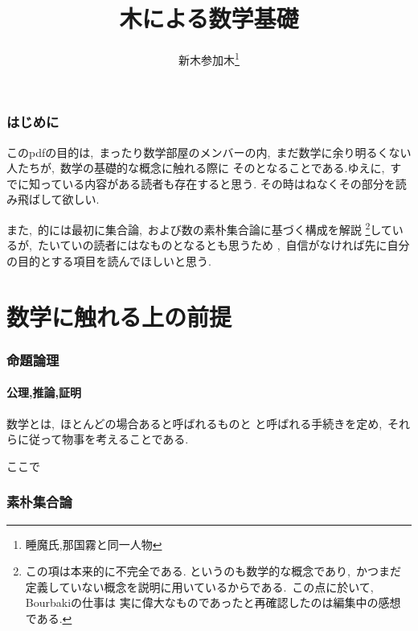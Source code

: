 \documentclass[hyperref,a4paper,12pt]{kininaruki}
\title{木による数学基礎}
\author{新木参加木\thanks{睡魔氏,那国霧と同一人物}}
\date{}
\begin{document}
\maketitle
\section*{はじめに}
このpdfの目的は,\, まったり数学部屋のメンバーの内,\, まだ数学に余り明るくない人たちが,\, 数学の基礎的な概念に触れる際に
そのとなることである.ゆえに,\, すでに知っている内容がある読者も存在すると思う.
その時はねなくその部分を読み飛ばして欲しい.

また,\, 的には最初に集合論,\, および数の素朴集合論に基づく構成を解説
\footnote{この項は本来的に不完全である.%
というのも数学的な概念であり,\, かつまだ定義していない概念を説明に用いているからである.%
\,この点に於いて,\, Bourbakiの仕事は%
実に偉大なものであったと再確認したのは編集中の感想である.}しているが,\, 
たいていの読者にはなものとなるとも思うため%
,\, 自信がなければ先に自分の目的とする項目を読んでほしいと思う.
\newpage
\tableofcontents
\newpage
\part{数学に触れる上の前提}
\section{命題論理}
\subsection{公理,推論,証明}
数学とは,\, ほとんどの場合あると呼ばれるものと%
と呼ばれる手続きを定め,\, それらに従って物事を考えることである.

ここで
\newpage
\section{素朴集合論}
\end{document}
